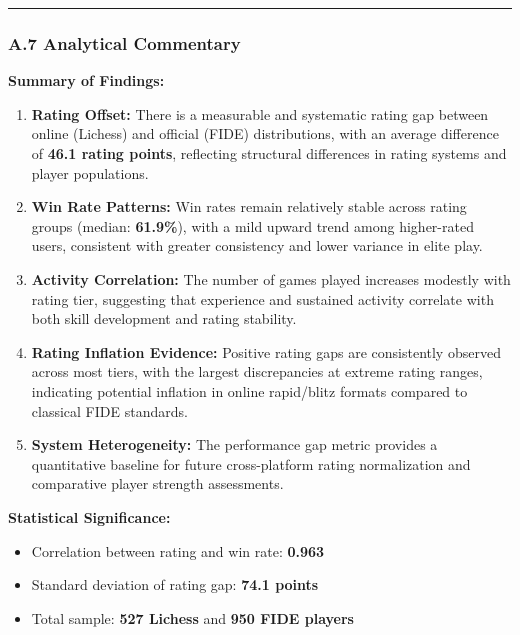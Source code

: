 \documentclass[
]{article}
\providecommand{\tightlist}{%
  \setlength{\itemsep}{0pt}\setlength{\parskip}{0pt}}
\begin{document}
\begin{center}\rule{0.5\linewidth}{0.5pt}\end{center}

\subsubsection{A.7 Analytical
Commentary}\label{a.7-analytical-commentary}

\textbf{Summary of Findings:}

\begin{enumerate}
\def\labelenumi{\arabic{enumi}.}
\item
  \textbf{Rating Offset:} There is a measurable and systematic rating
  gap between online (Lichess) and official (FIDE) distributions, with
  an average difference of \textbf{46.1 rating points}, reflecting
  structural differences in rating systems and player populations.
\item
  \textbf{Win Rate Patterns:} Win rates remain relatively stable across
  rating groups (median: \textbf{61.9\%}), with a mild upward trend
  among higher-rated users, consistent with greater consistency and
  lower variance in elite play.
\item
  \textbf{Activity Correlation:} The number of games played increases
  modestly with rating tier, suggesting that experience and sustained
  activity correlate with both skill development and rating stability.
\item
  \textbf{Rating Inflation Evidence:} Positive rating gaps are
  consistently observed across most tiers, with the largest
  discrepancies at extreme rating ranges, indicating potential inflation
  in online rapid/blitz formats compared to classical FIDE standards.
\item
  \textbf{System Heterogeneity:} The performance gap metric provides a
  quantitative baseline for future cross-platform rating normalization
  and comparative player strength assessments.
\end{enumerate}

\textbf{Statistical Significance:}

\begin{itemize}
\tightlist
\item
  Correlation between rating and win rate: \textbf{0.963}
\item
  Standard deviation of rating gap: \textbf{74.1 points}
\item
  Total sample: \textbf{527 Lichess} and \textbf{950 FIDE players}
\end{itemize}
\end{document}
